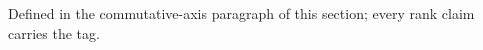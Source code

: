 \begin{description}[itemsep=4pt, leftmargin=2em]
  \item[Commutative vs non-commutative.] Defined in the
    commutative-axis paragraph of this section; every rank claim
    carries the tag.

\end{description}
